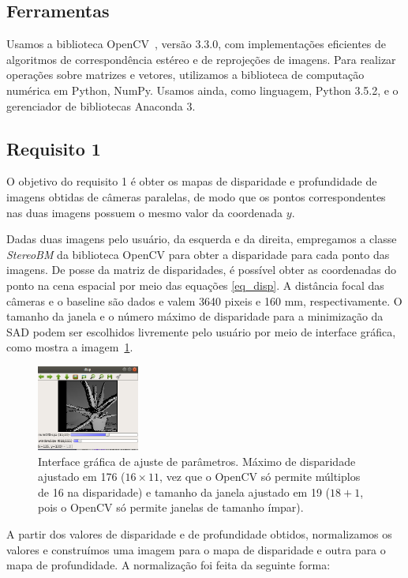 \documentclass{bmvc2k}
\begin{document}
\subsection{Ferramentas}
Usamos a biblioteca OpenCV~\cite{opencv_library}, versão 3.3.0, com implementações eficientes de algoritmos de correspondência estéreo e de reprojeções de imagens. Para realizar operações sobre matrizes e vetores, utilizamos a biblioteca de computação numérica em Python, NumPy. Usamos ainda, como linguagem, Python 3.5.2, e o gerenciador de bibliotecas Anaconda 3.

\subsection{Requisito 1}
O objetivo do requisito 1 é obter os mapas de disparidade e profundidade de imagens obtidas de câmeras paralelas, de modo que os pontos correspondentes nas duas imagens possuem o mesmo valor da coordenada $y$.

Dadas duas imagens pelo usuário, da esquerda e da direita, empregamos a classe \textit{StereoBM} da biblioteca OpenCV para obter a disparidade para cada ponto das imagens. De posse da matriz de disparidades, é possível obter as coordenadas do ponto na cena espacial por meio das equações \ref{eq_disp}. A distância focal das câmeras e o baseline são dados e valem 3640 pixeis e 160 mm, respectivamente. O tamanho da janela e o número máximo de disparidade para a minimização da SAD podem ser escolhidos livremente pelo usuário por meio de interface gráfica, como mostra a imagem~\ref{fig:trackbar}.

\begin{figure}[htb] 
\centering
\includegraphics[width=0.3\textwidth]{figs/trackbar.png}
\caption{Interface gráfica de ajuste de parâmetros. Máximo de disparidade ajustado em 176 ($16 \times 11$, vez que o OpenCV só permite múltiplos de 16 na disparidade) e tamanho da janela ajustado em 19 ($18 + 1$, pois o OpenCV só permite janelas de tamanho ímpar). \label{fig:trackbar}}
\end{figure}

A partir dos valores de disparidade e de profundidade obtidos, normalizamos os valores e construímos uma imagem para o mapa de disparidade e outra para o mapa de profundidade. A normalização foi feita da seguinte forma:
\end{document}
